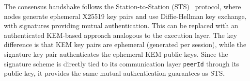 The consensus handshake follows the Station-to-Station (STS)~\cite{DCC:DifvOoWie92} protocol, where nodes generate ephemeral X25519 key pairs and use Diffie-Hellman key exchange, with signatures providing mutual authentication.
This can be replaced with an authenticated KEM-based approach analogous to the execution layer.
The key difference is that KEM key pairs are ephemeral (generated per session), while the signature key pair authenticates the ephemeral KEM public keys. Since the signature scheme is directly tied to its communication layer \texttt{peerId} through its public key, it provides the same mutual authentication guarantees as STS.
